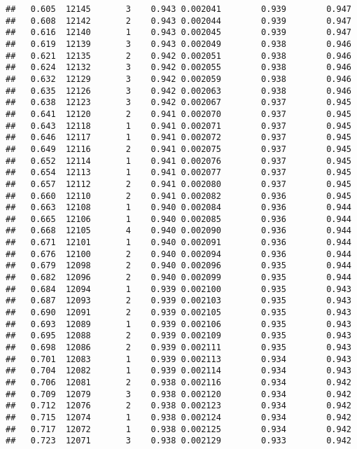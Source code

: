 \documentclass[
]{book}
\begin{document}
\begin{verbatim}
##   0.605  12145       3    0.943 0.002041        0.939        0.947
##   0.608  12142       2    0.943 0.002044        0.939        0.947
##   0.616  12140       1    0.943 0.002045        0.939        0.947
##   0.619  12139       3    0.943 0.002049        0.938        0.946
##   0.621  12135       2    0.942 0.002051        0.938        0.946
##   0.624  12132       3    0.942 0.002055        0.938        0.946
##   0.632  12129       3    0.942 0.002059        0.938        0.946
##   0.635  12126       3    0.942 0.002063        0.938        0.946
##   0.638  12123       3    0.942 0.002067        0.937        0.945
##   0.641  12120       2    0.941 0.002070        0.937        0.945
##   0.643  12118       1    0.941 0.002071        0.937        0.945
##   0.646  12117       1    0.941 0.002072        0.937        0.945
##   0.649  12116       2    0.941 0.002075        0.937        0.945
##   0.652  12114       1    0.941 0.002076        0.937        0.945
##   0.654  12113       1    0.941 0.002077        0.937        0.945
##   0.657  12112       2    0.941 0.002080        0.937        0.945
##   0.660  12110       2    0.941 0.002082        0.936        0.945
##   0.663  12108       1    0.940 0.002084        0.936        0.944
##   0.665  12106       1    0.940 0.002085        0.936        0.944
##   0.668  12105       4    0.940 0.002090        0.936        0.944
##   0.671  12101       1    0.940 0.002091        0.936        0.944
##   0.676  12100       2    0.940 0.002094        0.936        0.944
##   0.679  12098       2    0.940 0.002096        0.935        0.944
##   0.682  12096       2    0.940 0.002099        0.935        0.944
##   0.684  12094       1    0.939 0.002100        0.935        0.943
##   0.687  12093       2    0.939 0.002103        0.935        0.943
##   0.690  12091       2    0.939 0.002105        0.935        0.943
##   0.693  12089       1    0.939 0.002106        0.935        0.943
##   0.695  12088       2    0.939 0.002109        0.935        0.943
##   0.698  12086       2    0.939 0.002111        0.935        0.943
##   0.701  12083       1    0.939 0.002113        0.934        0.943
##   0.704  12082       1    0.939 0.002114        0.934        0.943
##   0.706  12081       2    0.938 0.002116        0.934        0.942
##   0.709  12079       3    0.938 0.002120        0.934        0.942
##   0.712  12076       2    0.938 0.002123        0.934        0.942
##   0.715  12074       1    0.938 0.002124        0.934        0.942
##   0.717  12072       1    0.938 0.002125        0.934        0.942
##   0.723  12071       3    0.938 0.002129        0.933        0.942

\end{verbatim}
\end{document}
